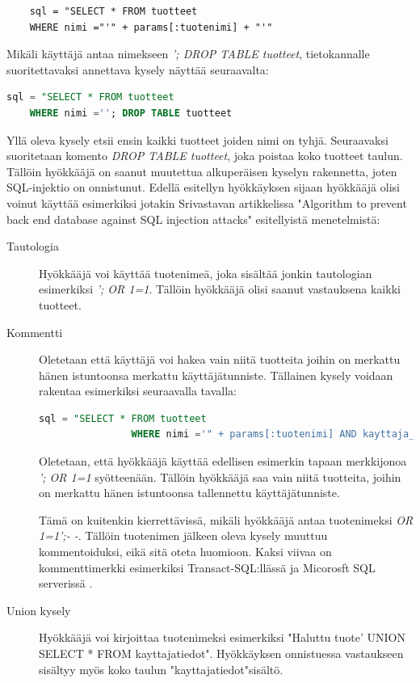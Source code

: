 \documentclass[finnish]{tktltiki2}
\theoremstyle{definition}
\theoremstyle{remark}
\begin{document}
	\begin{lstlisting}
	sql = "SELECT * FROM tuotteet
	WHERE nimi ="'" + params[:tuotenimi] + "'"
	\end{lstlisting}
	
	Mikäli käyttäjä antaa nimekseen \textit{'; DROP TABLE tuotteet}, tietokannalle suoritettavaksi annettava kysely näyttää seuraavalta:
	\pagebreak
	
	\begin{lstlisting}[language=sql]
	sql = "SELECT * FROM tuotteet
	WHERE nimi =''; DROP TABLE tuotteet     
	\end{lstlisting}
	
	Yllä oleva kysely etsii ensin kaikki tuotteet joiden nimi on tyhjä. Seuraavaksi suoritetaan komento \textit{DROP TABLE tuotteet}, joka poistaa koko tuotteet taulun. Tällöin hyökkääjä on saanut muutettua alkuperäisen kyselyn rakennetta, joten SQL-injektio on onnistunut. Edellä esitellyn hyökkäyksen sijaan hyökkääjä olisi voinut käyttää esimerkiksi jotakin Srivastavan artikkelissa "Algorithm to prevent back end database against SQL injection attacks"\space \cite{piggy} esitellyistä menetelmistä:  
		\begin{description}
			
		\item[Tautologia] \hfill
		
		Hyökkääjä voi käyttää tuotenimeä, joka sisältää jonkin tautologian esimerkiksi \textit{'; OR 1=1}. Tällöin hyökkääjä olisi saanut vastauksena kaikki tuotteet.
		
		\item[Kommentti] \hfill
		
		Oletetaan että käyttäjä voi hakea vain niitä tuotteita joihin on merkattu hänen istuntoonsa merkattu käyttäjätunniste. Tällainen kysely voidaan rakentaa esimerkiksi seuraavalla tavalla:
			\begin{lstlisting}[language=sql]
				sql = "SELECT * FROM tuotteet
				WHERE nimi ='" + params[:tuotenimi] AND kayttaja_id = session[:kayttaja_id]"'
			\end{lstlisting}
			Oletetaan, että hyökkääjä käyttää edellisen esimerkin tapaan merkkijonoa \textit{'; OR 1=1} syötteenään. Tällöin hyökkääjä saa vain niitä tuotteita, joihin on merkattu hänen istuntoonsa tallennettu käyttäjätunniste. 
			
			Tämä on kuitenkin kierrettävissä, mikäli hyökkääjä antaa tuotenimeksi \textit{OR 1=1';- -}. Tällöin tuotenimen jälkeen oleva kysely muuttuu kommentoiduksi, eikä sitä oteta huomioon. Kaksi viivaa on kommenttimerkki esimerkiksi Transact-SQL:llässä ja Micorosft SQL serverissä \cite{sqlids}.
			
		\item[Union kysely] \hfill
		
		Hyökkääjä voi kirjoittaa tuotenimeksi esimerkiksi "Haluttu tuote' UNION SELECT * FROM kayttajatiedot". Hyökkäyksen onnistuessa vastaukseen sisältyy myös koko taulun "kayttajatiedot"\space sisältö.
	\end{description}
	
\end{document}

